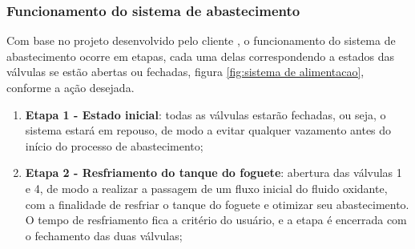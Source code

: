 \subsubsection{Funcionamento do sistema de abastecimento}
\par Com base no projeto desenvolvido pelo cliente \cite{capitalrocketteam2020}, o funcionamento do sistema de abastecimento ocorre em etapas, cada uma delas correspondendo a estados das válvulas se estão abertas ou fechadas, figura \ref{fig:sistema de alimentacao}, conforme a ação desejada. 

\begin{enumerate}
    \item \textbf{Etapa 1 - Estado inicial}: todas as válvulas estarão fechadas, ou seja, o sistema estará em repouso, de modo a evitar qualquer vazamento antes do início do processo de abastecimento; 
    
    \item \textbf{Etapa 2 - Resfriamento do tanque do foguete}: abertura das válvulas 1 e 4, de modo a realizar a passagem de um fluxo inicial do fluido oxidante, com a finalidade de resfriar o tanque do foguete e otimizar seu abastecimento. O tempo de resfriamento fica a critério do usuário, e a etapa é encerrada com o fechamento das duas válvulas;
    

\end{enumerate}
